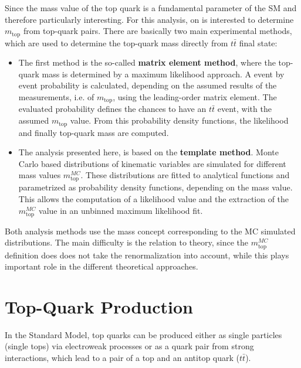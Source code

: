 Since the mass value of the top quark is  a fundamental parameter of the SM and therefore particularly interesting. For this analysis, on is interested to determine $m_{\text{top}}$ from top-quark pairs. There are basically two main experimental methods, which are used to determine the top-quark mass directly from $t\bar{t}$ final state:


\begin{itemize}
	
	\item The first method is the so-called \textbf{matrix element method}, where the top-quark mass is determined by a maximum likelihood approach. A event by event probability is calculated, depending on the assumed results of the measurements, i.e. of $m_{\text{top}}$, using the leading-order matrix element. The evaluated probability defines the chances to have an $t\bar{t}$ event, with the assumed $m_{\text{top}}$ value. From this probability density functions, the likelihood and finally top-quark mass are computed.~\cite{Castro:2014cva}   
	
	\item The analysis presented here, is based on the \textbf{template method}. Monte Carlo based distributions of kinematic variables are simulated for different mass values $m_{	\text{top}}^{MC}$. These distributions are fitted to analytical functions and parametrized as probability density functions,  depending on the mass value. This allows the computation of a likelihood value and the extraction of the $m_{\text{top}}^{MC}$ value in an unbinned maximum likelihood fit.   
\end{itemize}

 Both analysis methods use the  mass concept corresponding to the MC simulated distributions. The main difficulty is the relation to  theory, since  the $m_{	\text{top}}^{MC}$ definition does does not take the  renormalization into account, while this plays  important role in the different theoretical approaches. 











   

\section{Top-Quark Production}
In the Standard Model, top quarks can be produced either as single particles 
(single tops) via electroweak processes or as a quark pair from strong interactions, which lead to a pair of a top and an antitop quark ($t\bar{t}$).    

